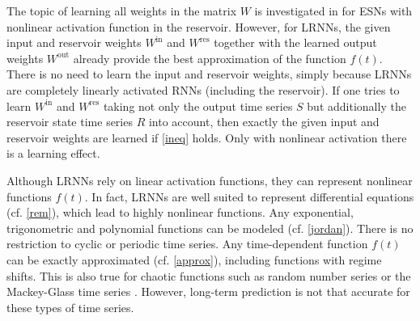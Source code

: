 \documentclass{sn-jnl}
\theoremstyle{definition}
\begin{document}
The topic of learning all weights in the matrix $W$ is investigated
in \citep{PDW13} for ESNs with nonlinear activation function in the reservoir.
However, for LRNNs, the given input and reservoir weights $W^\mathrm{in}$ and
$W^\mathrm{res}$ together with the learned output weights $W^\mathrm{out}$
already provide the best approximation of the function $f(t)$. There is no need
to learn the input and reservoir weights, simply because LRNNs are completely
linearly activated RNNs (including the reservoir). If one tries to learn
$W^\mathrm{in}$ and $W^\mathrm{res}$ taking not only the output time series $S$
but additionally the reservoir state time series $R$ into account, then exactly
the given input and reservoir weights are learned if \cref{ineq} holds. Only
with nonlinear activation there is a learning effect.

Although LRNNs rely on linear activation functions, they can represent
nonlinear functions $f(t)$. In fact, LRNNs are well suited to represent
differential equations (cf. \cref{rem}), which lead to highly nonlinear
functions. Any exponential, trigonometric and polynomial functions can be
modeled (cf. \cref{jordan}). There is no restriction to cyclic or periodic time
series. Any time-dependent function $f(t)$ can be exactly approximated (cf.
\cref{approx}), including functions with regime shifts. This is also true for
chaotic functions such as random number series or the Mackey-Glass time series
\citep{MG77,JH04}. However, long-term prediction is not that accurate for these
types of time series.
\end{document}
